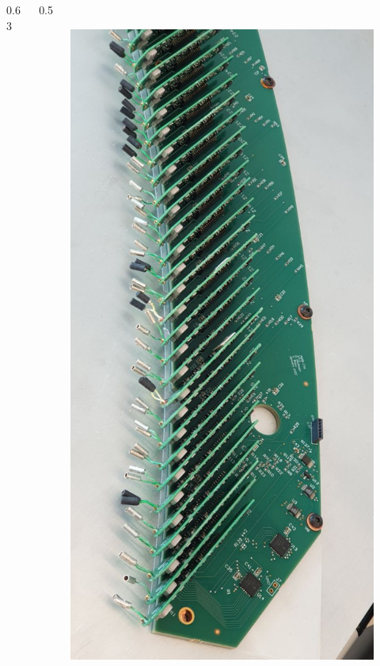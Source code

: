 \documentclass{beamer}
\begin{document}
\begin{frame}
\begin{columns}
\begin{column}{0.63\framewidth}
\begin{itemize}
\end{itemize}
\end{column}
\begin{column}{0.5\framewidth}
         \begin{figure}[!h]
      \centering
      \hspace*{-2em}
      \includegraphics[angle=90,width=1.1\columnwidth]{figures/jpg/photo_6028424923279639562_y.jpg}
     \label{fig:normalhits}
\end{figure}
\end{column}
\end{columns}
\end{frame}
\end{document}
